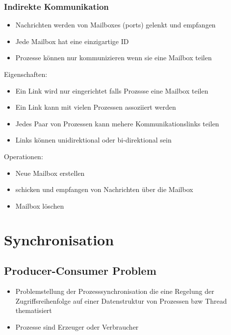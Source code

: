 \documentclass[a4paper]{scrreprt}
\begin{document}
\subsubsection{Indirekte Kommunikation}
	\begin{itemize}
		\item Nachrichten werden von Mailboxes (ports) gelenkt und empfangen
		\item Jede Mailbox hat eine einzigartige ID
		\item Prozesse können nur kommunizieren wenn sie eine Mailbox teilen
	\end{itemize}
	Eigenschaften:
	\begin{itemize}
		\item Ein Link wird nur eingerichtet falls Prozssse eine Mailbox teilen
		\item Ein Link kann mit vielen Prozessen assoziiert werden
		\item Jedes Paar von Prozessen kann mehere Kommunikationslinks teilen
		\item Links können unidirektional oder bi-direktional sein
	\end{itemize}
	Operationen:
	\begin{itemize}
		\item Neue Mailbox erstellen
		\item schicken und empfangen von Nachrichten über die Mailbox
		\item Mailbox löschen
	\end{itemize}
	
\section{Synchronisation}
	\subsection {Producer-Consumer Problem}
		\begin{itemize}
			\item Problemstellung der Prozesssynchronisation die eine Regelung der Zugriffsreihenfolge auf einer Datenstruktur von Prozessen bzw Thread thematisiert
			\item Prozesse sind Erzeuger oder Verbraucher
		\end{itemize}	
\end{document}

